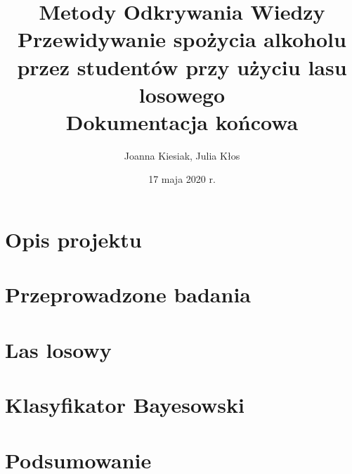 \documentclass{article}
\title{{\normalfont Metody Odkrywania Wiedzy}\vspace{0.2cm} \\ 
\textbf{Przewidywanie spożycia alkoholu przez studentów przy użyciu lasu losowego}\\
\vspace{0.2cm}
\large{\normalfont Dokumentacja końcowa}}
\author{
Joanna Kiesiak, Julia Kłos\\

}
\date{17 maja 2020 r.}
\begin{document}
\maketitle



\section{Opis projektu}


\section{Przeprowadzone badania}


\section{Las losowy}

\FloatBarrier
\section{Klasyfikator Bayesowski}


\section{Podsumowanie}


\printbibliography

\begin{appendices}


\

\end{appendices}
\end{document}
